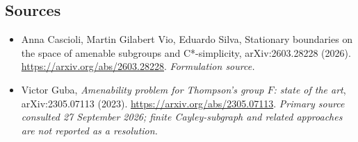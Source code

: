 \documentclass[11pt]{article}
\begin{document}
\subsection{Sources}
\begin{itemize}
\item[S1]Anna Cascioli, Martin Gilabert Vio, Eduardo Silva, Stationary boundaries on the space of amenable subgroups and C*-simplicity, arXiv:2603.28228 (2026).
\url{https://arxiv.org/abs/2603.28228}.
\textit{Formulation source.}
\item[E1]Victor Guba, \emph{Amenability problem for Thompson's group $F$: state of the art}, arXiv:2305.07113 (2023).
\url{https://arxiv.org/abs/2305.07113}.
\textit{Primary source consulted 27 September 2026; finite Cayley-subgraph and related approaches are not reported as a resolution.}
\end{itemize}
\end{document}
